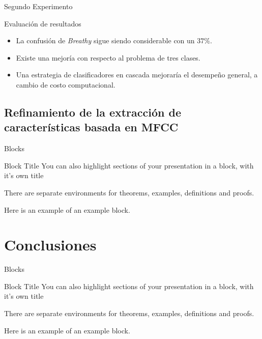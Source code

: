 \documentclass[aspectratio=169]{beamer}
\begin{document}
\begin{frame}{Segundo Experimento}
\begin{block}{Evaluación de resultados}
\begin{itemize}
\item La confusión de \textit{Breathy} sigue siendo considerable con un $37\%$.
\item Existe una mejoría con respecto al problema de tres clases.
\item Una estrategia de clasificadores en cascada mejoraría el desempeño general, a cambio de costo computacional.
\end{itemize}
\end{block}
\end{frame}

\subsection{Refinamiento de la extracción de características basada en MFCC}

\begin{frame}{Blocks}
\begin{block}{Block Title}
You can also highlight sections of your presentation in a block, with it's own title
\end{block}
\begin{theorem}
There are separate environments for theorems, examples, definitions and proofs.
\end{theorem}
\begin{example}
Here is an example of an example block.
\end{example}
\end{frame}

\section{Conclusiones}

\begin{frame}{Blocks}
\begin{block}{Block Title}
You can also highlight sections of your presentation in a block, with it's own title
\end{block}
\begin{theorem}
There are separate environments for theorems, examples, definitions and proofs.
\end{theorem}
\begin{example}
Here is an example of an example block.
\end{example}
\end{frame}
\end{document}
